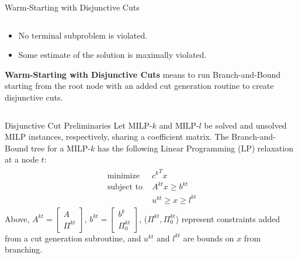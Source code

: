 \documentclass[final]{beamer}
\newlength{\colwidth}
\begin{document}
\begin{frame}[t]
\begin{columns}[t]
\begin{column}{\colwidth}
\begin{block}{Warm-Starting with Disjunctive Cuts}
\begin{columns}[T]
\begin{column}{0.6\textwidth}
   			\begin{itemize}
   				\item No terminal subproblem is violated.
   				\item Some estimate of the solution is maximally violated.
   			\end{itemize}
   			\textbf{Warm-Starting with Disjunctive Cuts} means to run Branch-and-Bound starting from the root node with an added cut generation routine to create disjunctive cuts.
    	\end{column}
    \end{columns}
  \end{block}

  \begin{block}{Disjunctive Cut Preliminaries}
  	Let MILP-$ k $ and MILP-$ l $ be solved and unsolved MILP instances, respectively, sharing a coefficient matrix. The Branch-and-Bound tree for a MILP-$ k $ has the following Linear Programming (LP) relaxation at a node $ t $:
	\begin{align}
		\begin{split}
			\text{minimize } & {c^k}^T x \\
			\text{subject to } & A^{kt}x \geq b^{kt} \\
			& u^{kt} \geq x \geq l^{kt}
		\end{split} \label{e:lp-kt} \tag{LP-$ kt $}
	\end{align}
	Above, $ A^{kt} = \begin{bmatrix} A \\ \Pi^{kt} \end{bmatrix} $, $ b^{kt} = \begin{bmatrix} b^k \\ \Pi_0^{kt} \end{bmatrix} $, ($ \Pi^{kt}, \Pi_0^{kt} $) represent constraints added from a cut generation subroutine, and $ u^{kt} $ and $ l^{kt} $ are bounds on $ x $ from branching.
	

\end{block}
\end{column}
\end{columns}
\end{frame}
\end{document}
